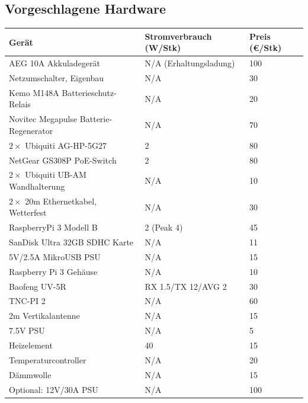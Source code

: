 \documentclass[a4paper]{scrartcl}
\begin{document}
\subsection{Vorgeschlagene Hardware}
\begin{longtabu} to \linewidth {XX[0.7]X[0.3]}
    \rowfont\bfseries Ger\"at & Stromverbrauch (W/Stk) & Preis (\euro/Stk) \\ \toprule
    \endhead

    AEG 10A Akkuladeger\"at                 & N/A (Erhaltungsladung)    & 100\\
    Netzumschalter, Eigenbau                & N/A                       & 30\\
    Kemo M148A Batterieschutz-Relais        & N/A                       & 20\\
    Novitec Megapulse Batterie-Regenerator  & N/A                       & 70\\
    \midrule
    $2\times$ Ubiquiti AG-HP-5G27           & 2                         & 80\\
    NetGear GS308P PoE-Switch               & 2                         & 80\\
    $2\times$ Ubiquiti UB-AM Wandhalterung  & N/A                       & 10\\
    $2\times$ 20m Ethernetkabel, Wetterfest & N/A                       & 30\\
    \midrule
    RaspberryPi 3 Modell B                  & 2 (Peak 4)                & 45\\
    SanDisk Ultra 32GB SDHC Karte           & N/A                       & 11\\
    5V/2.5A MikroUSB PSU                    & N/A                       & 15\\
    Raspberry Pi 3 Geh\"ause                & N/A                       & 10\\
    \midrule
    Baofeng UV-5R                           & RX 1.5/TX 12/AVG 2        & 30\\
    TNC-PI 2                                & N/A                       & 60\\
    2m Vertikalantenne                      & N/A                       & 15\\
    7.5V PSU                                & N/A                       & 5\\
    \midrule
    Heizelement                             & 40                        & 15\\
    Temperaturcontroller                    & N/A                       & 20\\
    D\"ammwolle                             & N/A                       & 15\\
    \midrule
    Optional: 12V/30A PSU                   & N/A                       & 100\\
    \bottomrule
\end{longtabu}
\end{document}

